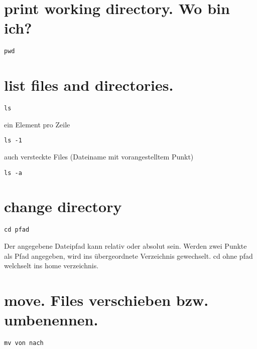 \documentclass[]{book}
\begin{document}
\hypertarget{print-working-directory.-wo-bin-ich}{%
\section{print working directory. Wo bin ich?}\label{print-working-directory.-wo-bin-ich}}

\begin{verbatim}
pwd
\end{verbatim}

\hypertarget{list-files-and-directories.}{%
\section{list files and directories.}\label{list-files-and-directories.}}

\begin{verbatim}
ls
\end{verbatim}

ein Element pro Zeile

\begin{verbatim}
ls -1
\end{verbatim}

auch versteckte Files (Dateiname mit vorangestelltem Punkt)

\begin{verbatim}
ls -a
\end{verbatim}

\hypertarget{change-directory}{%
\section{change directory}\label{change-directory}}

\begin{verbatim}
cd pfad
\end{verbatim}

Der angegebene Dateipfad kann relativ oder absolut sein. Werden zwei Punkte als Pfad angegeben, wird ins übergeordnete Verzeichnis gewechselt.
cd ohne pfad welchselt ins home verzeichnis.

\hypertarget{move.-files-verschieben-bzw.-umbenennen.}{%
\section{move. Files verschieben bzw. umbenennen.}\label{move.-files-verschieben-bzw.-umbenennen.}}

\begin{verbatim}
mv von nach
\end{verbatim}
\end{document}
